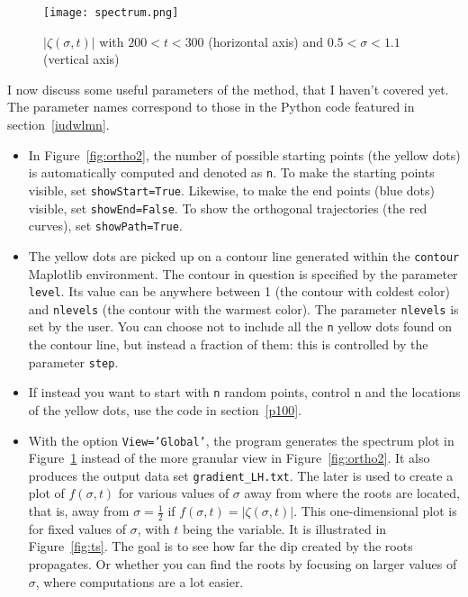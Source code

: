 \documentclass[oneside,10pt]{book}
\begin{document}
\begin{figure}%
\centering
\texttt{[image: spectrum.png]} %
\caption{$|\zeta(\sigma,t)|$ with $200<t<300$ (horizontal axis) and $0.5 < \sigma < 1.1$ (vertical axis)}
\label{fig:spectrum}
\end{figure}
 
I now discuss some useful parameters of the method, that I haven't covered yet. The parameter names correspond  to those in the Python code featured in section~\ref{iudwlmn}. \vspace{1ex}

\begin{itemize}
\item In Figure~\ref{fig:ortho2}, the number of possible starting points (the yellow dots) is automatically computed and denoted as \texttt{n}. To make the
 starting points visible, set \texttt{showStart=True}. Likewise, to make the end points (blue dots) visible, set \texttt{showEnd=False}. 
 To show the orthogonal trajectories (the red curves), set \texttt{showPath=True}.
\item  The yellow dots are picked up on a contour line generated within the \texttt{contour} Maplotlib environment. The contour in question 
 is specified by the parameter \texttt{level}. Its value can be anywhere between 1 (the contour with coldest color) and \texttt{nlevels} (the 
 contour with the warmest color). The parameter \texttt{nlevels} is set by the user. You can choose not to include all the \texttt{n} yellow dots 
 found on the contour line, but instead a fraction of them:  this is controlled by the parameter \texttt{step}. 
\item If instead you want to start with \texttt{n} random points, control {n} and the locations of the yellow dots, use the code in section~\ref{p100}.
\item With the option \texttt{View='Global'}, the program generates the spectrum plot in Figure~\ref{fig:spectrum} instead of the
 more granular view in Figure~\ref{fig:ortho2}. It also produces the output data set \texttt{gradient\_LH.txt}. The later is used to create a plot of
 $f(\sigma, t)$ for various values of $\sigma$ away from where the roots are located, that is, away from $\sigma=\frac{1}{2}$ 
 if $f(\sigma,t)=|\zeta(\sigma,t)|$. This one-dimensional plot is for fixed values of $\sigma$, with $t$ being the variable. It is illustrated in Figure~\ref{fig:ts}. The goal is to see how far the dip created by the roots propagates. Or whether you can find the roots by focusing on larger values of $\sigma$, where computations are a lot easier.
\end{itemize}
\end{document}
